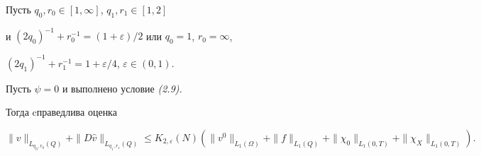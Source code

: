 \documentclass[12pt]{article}
\theoremstyle{plain} %
\newtheorem{lemm}{\hskip\parindent Лемма}[section]
\theoremstyle{definition}
\numberwithin{equation}{section}
\begin{document}
\begin{lemm} Пусть $q_0,r_0\in [1,\infty]$, $q_1,r_1\in [1,2]$


и $(2q_0)^{-1}+r_0^{-1}=(1+\varepsilon)/2$ или $q_0=1$, $r_0=\infty$,


$(2q_1)^{-1}+r_1^{-1}=1+\varepsilon/4$, $\varepsilon\in (0,1)$.


Пусть $\psi=0$ и выполнено условие {\em (2.9).}


Тогда cправедлива оценка


\begin{equation}


\|v\|_{L_{q_0,r_0}(Q)}+


\|D\widehat v\|_{L_{q_1,r_1}(Q)}\le


K_{2,\varepsilon}(N)(\|v^0\|_{L_1(\Omega)}+\|f\|_{L_1(Q)}+


\|\chi_0\|_{L_1(0,T)}+\|\chi_X\|_{L_1(0,T)}).


\end{equation}


\end{lemm}
\end{document}
